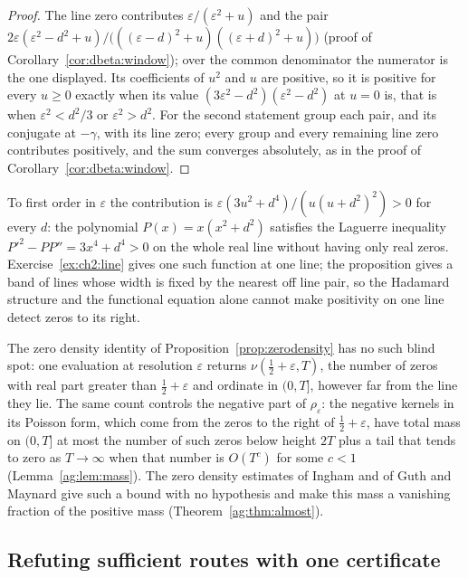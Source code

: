 \begin{proof}
The line zero contributes $\varepsilon/(\varepsilon^2+u)$ and the pair $2\varepsilon(\varepsilon^2-d^2+u)/\big(((\varepsilon-d)^2+u)((\varepsilon+d)^2+u)\big)$ (proof of Corollary~\ref{cor:dbeta:window}); over the common denominator the numerator is the one displayed. Its coefficients of $u^2$ and $u$ are positive, so it is positive for every $u\ge0$ exactly when its value $(3\varepsilon^2-d^2)(\varepsilon^2-d^2)$ at $u=0$ is, that is when $\varepsilon^2<d^2/3$ or $\varepsilon^2>d^2$. For the second statement group each pair, and its conjugate at $-\gamma$, with its line zero; every group and every remaining line zero contributes positively, and the sum converges absolutely, as in the proof of Corollary~\ref{cor:dbeta:window}.
\end{proof}

To first order in $\varepsilon$ the contribution is $\varepsilon(3u^2+d^4)/(u(u+d^2)^2)>0$ for every $d$: the polynomial $P(x)=x(x^2+d^2)$ satisfies the Laguerre inequality $P'^2-PP''=3x^4+d^4>0$ on the whole real line without having only real zeros. Exercise~\ref{ex:ch2:line} gives one such function at one line; the proposition gives a band of lines whose width is fixed by the nearest off line pair, so the Hadamard structure and the functional equation alone cannot make positivity on one line detect zeros to its right.

The zero density identity of Proposition~\ref{prop:zerodensity} has no such blind spot: one evaluation at resolution $\varepsilon$ returns $\nu(\frac12+\varepsilon,T)$, the number of zeros with real part greater than $\frac12+\varepsilon$ and ordinate in $(0,T]$, however far from the line they lie. The same count controls the negative part of $\rho_\varepsilon$: the negative kernels in its Poisson form, which come from the zeros to the right of $\frac12+\varepsilon$, have total mass on $(0,T]$ at most the number of such zeros below height $2T$ plus a tail that tends to zero as $T\to\infty$ when that number is $O(T^c)$ for some $c<1$ (Lemma~\ref{ag:lem:mass}). The zero density estimates of Ingham \cite{Ingham40} and of Guth and Maynard \cite{GM26} give such a bound with no hypothesis and make this mass a vanishing fraction of the positive mass (Theorem~\ref{ag:thm:almost}).

\subsection{Refuting sufficient routes with one certificate}

